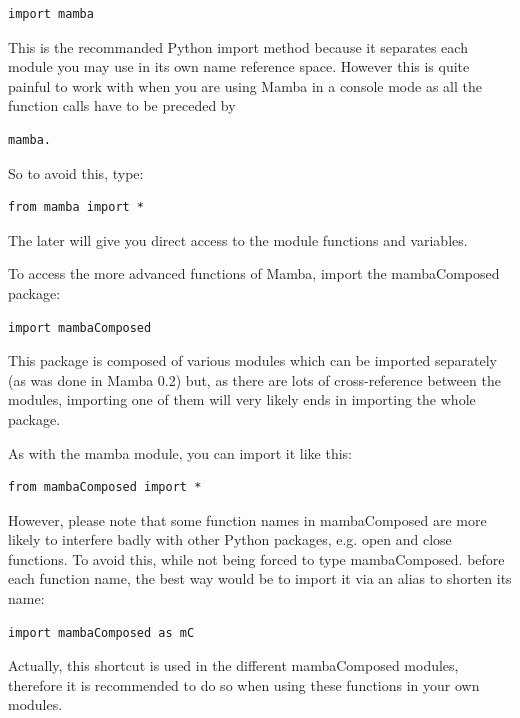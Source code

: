 \documentclass[a4paper,10pt,oneside]{article}
\begin{document}
\lstset{language=Python}
\begin{lstlisting}
import mamba
\end{lstlisting}

This is the recommanded Python import method because it separates each module
you may use in its own name reference space. However this is quite painful
to work with when you are using Mamba in a console mode as all the function 
calls have to be preceded by

\lstset{language=Python}
\begin{lstlisting}
mamba.
\end{lstlisting}

So to avoid this, type:

\lstset{language=Python}
\begin{lstlisting}
from mamba import *
\end{lstlisting}

The later will give you direct access to the module functions and variables.

To access the more advanced functions of Mamba, import the mambaComposed package:

\lstset{language=Python}
\begin{lstlisting}
import mambaComposed
\end{lstlisting}

This package is composed of various modules which can be imported separately (as
was done in Mamba 0.2) but, as there are lots of cross-reference between the
modules, importing one of them will very likely ends in importing the whole
package.

As with the mamba module, you can import it like this:

\lstset{language=Python}
\begin{lstlisting}
from mambaComposed import *
\end{lstlisting}

However, please note that some function names in mambaComposed are more likely to
interfere badly with other Python packages, e.g. open and close functions. To 
avoid this, while not being forced to type mambaComposed. before each function 
name, the best way would be to import it via an alias to shorten its name:

\lstset{language=Python}
\begin{lstlisting}
import mambaComposed as mC
\end{lstlisting}

Actually, this shortcut is used in the different mambaComposed modules, therefore it 
is recommended to do so when using these functions in your own modules.
\end{document}
